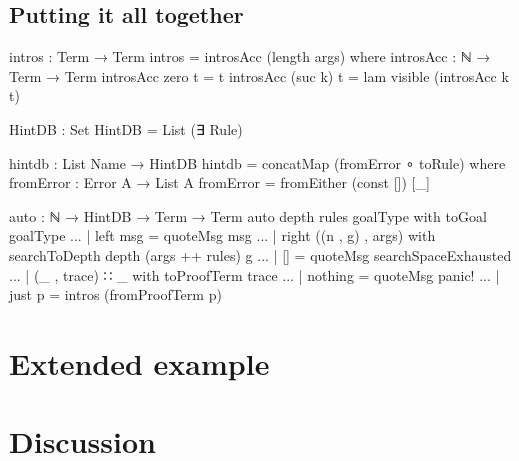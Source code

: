 \documentclass[preprint]{sigplanconf}
\begin{document}
\subsection*{Putting it all together}

\begin{code}
intros : Term → Term
intros = introsAcc (length args)
  where
    introsAcc : ℕ → Term → Term
    introsAcc  zero   t = t
    introsAcc (suc k) t = lam visible (introsAcc k t)
\end{code}

\begin{code}
HintDB : Set
HintDB = List (∃ Rule)

hintdb : List Name → HintDB
hintdb = concatMap (fromError ∘ toRule)
  where
    fromError : Error A → List A
    fromError = fromEither (const []) [_]
\end{code}


\begin{code}
auto : ℕ → HintDB → Term → Term
auto depth rules goalType
  with toGoal goalType
... | left msg = quoteMsg msg
... | right ((n , g) , args)
  with searchToDepth depth (args ++ rules) g
... | [] = quoteMsg searchSpaceExhausted
... | (_ , trace) ∷ _
  with toProofTerm trace
... | nothing = quoteMsg panic!
... | just p  = intros (fromProofTerm p)
\end{code}

\section{Extended example}
\label{sec:example}


\section{Discussion}
\label{sec:discussion}

\end{document}
